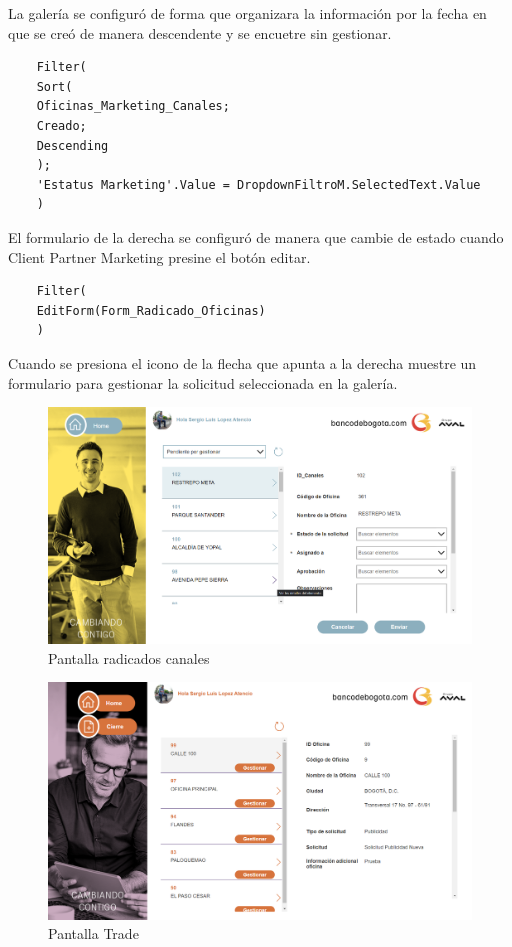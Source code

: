 La galería se configuró de forma que organizara la información por la fecha en que se creó de manera descendente y se encuetre sin gestionar.
\begin{verbatim}
	Filter(
	Sort(
	Oficinas_Marketing_Canales;
	Creado;
	Descending
	);
	'Estatus Marketing'.Value = DropdownFiltroM.SelectedText.Value
	)
\end{verbatim}

El formulario de la derecha se configuró de manera que cambie de estado cuando Client Partner Marketing presine el botón editar.
\begin{verbatim}
	Filter(
	EditForm(Form_Radicado_Oficinas)
	)
\end{verbatim}

Cuando se presiona el icono de la flecha que apunta a la derecha muestre un formulario para gestionar la solicitud seleccionada en la galería.

\begin{figure}[H]
	\centering
	\includegraphics[scale=0.25]{Capitulo4/imagenes/21.png}
	\caption{Pantalla radicados canales}
	\label{PNMark}
\end{figure}

\begin{figure}[H]
	\centering
	\includegraphics[scale=0.25]{Capitulo4/imagenes/22.png}
	\caption{Pantalla Trade}
	\label{PTrade}
\end{figure}


